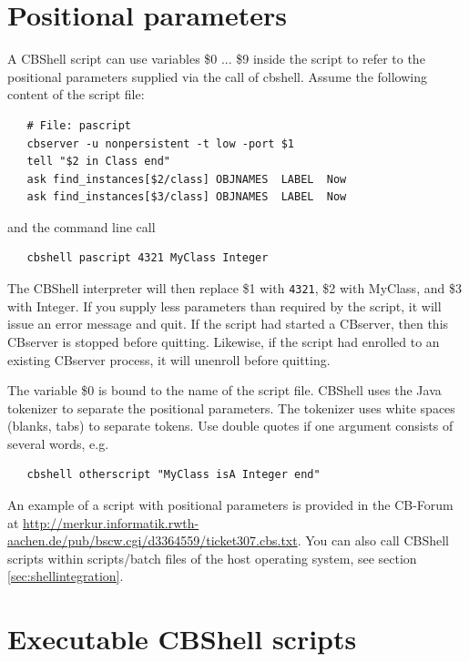 \section{Positional parameters}
\label{sec:cbshellvars}

A CBShell script can use variables \$0 ... \$9 inside the script to refer to 
the positional parameters supplied via the call of cbshell. Assume the following content
of the script file:

\begin{verbatim}
   # File: pascript
   cbserver -u nonpersistent -t low -port $1
   tell "$2 in Class end"
   ask find_instances[$2/class] OBJNAMES  LABEL  Now
   ask find_instances[$3/class] OBJNAMES  LABEL  Now
\end{verbatim}

and the command line call

\begin{verbatim}
   cbshell pascript 4321 MyClass Integer
\end{verbatim}


The CBShell interpreter will then replace \$1 with {\tt 4321}, \$2 with MyClass, and
\$3 with Integer.
If you supply less parameters than required by the script, it will issue an error message and quit.
If the script had started a CBserver, then this CBserver is stopped before quitting. 
Likewise, if the script had enrolled to an existing CBserver process, it will unenroll
before quitting.

The variable \$0 is bound to the name
of the script file. CBShell uses the Java tokenizer to separate the positional parameters.
The tokenizer uses white spaces (blanks, tabs) to separate tokens. Use double quotes
if one argument consists of several words, e.g. 

\begin{verbatim}
   cbshell otherscript "MyClass isA Integer end"
\end{verbatim}

An example of a script with positional parameters is provided in the CB-Forum at
\url{http://merkur.informatik.rwth-aachen.de/pub/bscw.cgi/d3364559/ticket307.cbs.txt}.
You can also call CBShell scripts within scripts/batch files of the host operating system,
see section \ref{sec:shellintegration}.


\section{Executable CBShell scripts}
\label{sec:execcbshell}

